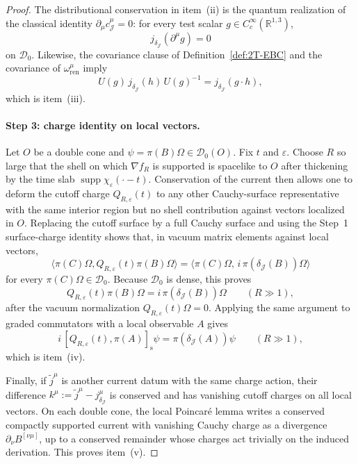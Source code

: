 \begin{proof}
The distributional conservation in item~\textnormal{(ii)} is the quantum realization of
the classical identity \(\partial_\mu c^\mu_{\mathcal J}=0\): for every test scalar
\(g\in C_c^\infty(\mathbb R^{1,3})\),
\[
j_{\delta_{\mathcal J}}(\partial^\mu g)=0
\]
on \(\mathcal D_0\).
Likewise, the covariance clause of Definition~\ref{def:2T-EBC} and the covariance of
\(\omega^\mu_{\mathrm{ren}}\) imply
\[
U(g)\,j_{\delta_{\mathcal J}}(h)\,U(g)^{-1}
=
j_{\delta_{\mathcal J}}(g\cdot h),
\]
which is item~\textnormal{(iii)}.

\paragraph{Step 3: charge identity on local vectors.}
Let \(O\) be a double cone and \(\psi=\pi(B)\Omega\in \mathcal D_0(O)\).
Fix \(t\) and \(\varepsilon\). Choose \(R\) so large that the shell on which
\(\nabla f_R\) is supported is spacelike to \(O\) after thickening by the time slab
\(\operatorname{supp}\chi_\varepsilon(\cdot-t)\).
Conservation of the current then allows one to deform the cutoff charge
\(Q_{R,\varepsilon}(t)\) to any other Cauchy-surface representative with the same
interior region but no shell contribution against vectors localized in \(O\).
Replacing the cutoff surface by a full Cauchy surface and using the Step~1
surface-charge identity shows that, in vacuum matrix elements against local vectors,
\[
\langle \pi(C)\Omega,Q_{R,\varepsilon}(t)\pi(B)\Omega\rangle
=
\langle \pi(C)\Omega,\, i\,\pi(\delta_{\mathcal J}(B))\Omega\rangle
\]
for every \(\pi(C)\Omega\in\mathcal D_0\).
Because \(\mathcal D_0\) is dense, this proves
\[
Q_{R,\varepsilon}(t)\pi(B)\Omega
=
i\,\pi(\delta_{\mathcal J}(B))\Omega
\qquad(R\gg 1),
\]
after the vacuum normalization \(Q_{R,\varepsilon}(t)\Omega=0\).
Applying the same argument to graded commutators with a local observable \(A\)
gives
\[
i\,[Q_{R,\varepsilon}(t),\pi(A)]_{\mathrm s}\psi
=
\pi(\delta_{\mathcal J}(A))\psi
\qquad(R\gg 1),
\]
which is item~\textnormal{(iv)}.

Finally, if \(\widetilde j^\mu\) is another current datum with the same charge action,
their difference \(k^\mu:=\widetilde j^\mu-j^\mu_{\delta_{\mathcal J}}\) is conserved and
has vanishing cutoff charges on all local vectors. On each double cone, the local
Poincar\'e lemma writes a conserved compactly supported current with vanishing Cauchy
charge as a divergence \(\partial_\nu B^{[\nu\mu]}\), up to a conserved remainder whose
charges act trivially on the induced derivation. This proves item~\textnormal{(v)}.
\end{proof}

